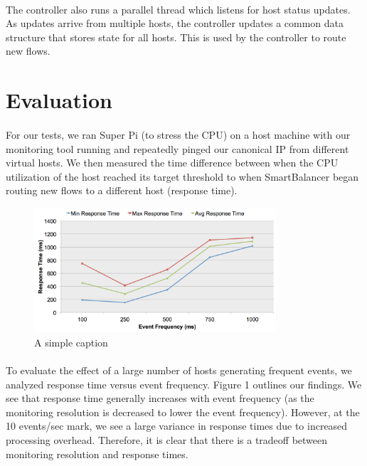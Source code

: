 \documentclass[10pt]{article}
\begin{document}
\paragraph{} The controller also runs a parallel thread which listens for host status updates. As updates arrive from multiple hosts, the controller updates a common data structure that stores state for all hosts. This is used by the controller to route new flows.

\section{Evaluation}
\label{sec:evaluation}

\paragraph{} For our tests, we ran Super Pi (to stress the CPU) on a host machine with our monitoring tool running and repeatedly pinged our canonical IP from different virtual hosts. We then measured the time difference between when the CPU utilization of the host reached its target threshold to when SmartBalancer began routing new flows to a different host (response time).

\begin{figure}[ht!]
\centering
\includegraphics[width=90mm]{responseTime.png}
\caption{A simple caption}
\label{pic:responseTime}
\end{figure}
\paragraph{} To evaluate the effect of a large number of hosts generating frequent events, we analyzed response time versus event frequency. Figure 1 outlines our findings. We see that response time generally increases with event frequency (as the monitoring resolution is decreased to lower the event frequency). However, at the 10 events/sec mark, we see a large variance in response times due to increased processing overhead. Therefore, it is clear that there is a tradeoff between monitoring resolution and response times.
\end{document}
